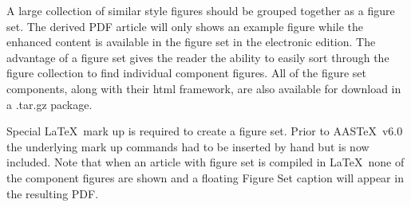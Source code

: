 \documentclass{aastex6}
\newcommand\aastex{AAS\TeX}
\newcommand\latex{La\TeX}
\begin{document}
A large collection of similar style figures should be grouped together as a
figure set.  The derived PDF article will only shows an example figure
while the enhanced content is available in the figure set in the electronic
edition.  The advantage of a figure set gives the reader the ability to
easily sort through the figure collection to find individual component
figures.  All of the figure set components, along with their html framework,
are also available for download in a .tar.gz package.

Special \latex\ mark up is required to create a figure set.  Prior to
\aastex\ v6.0 the underlying mark up commands had to be inserted by hand
but is now included.  Note that when an article with figure set is compiled
in \latex\ none of the component figures are shown and a floating Figure
Set caption will appear in the resulting PDF.

\figsetstart
{}

\figsetgrpstart
{}
\figsetgrpend

\figsetgrpstart
{}
\figsetgrpend

\figsetgrpstart
{}
\figsetgrpend

\figsetgrpstart
{}
\figsetgrpend

\figsetgrpstart
{}
\figsetgrpend

\figsetgrpstart
{}
\figsetgrpend

\figsetgrpstart
{}
\figsetgrpend

\figsetgrpstart
{}
\figsetgrpend
\end{document}
